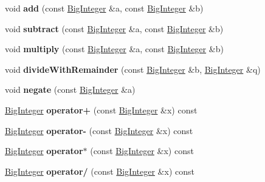 \begin{DoxyCompactItemize}
void {\bfseries add} (const \mbox{\hyperlink{class_big_integer}{Big\+Integer}} \&a, const \mbox{\hyperlink{class_big_integer}{Big\+Integer}} \&b)
\item 
\mbox{\label{class_big_integer_aa7b823f26e3d7716bd8922083548f0c2}} 
void {\bfseries subtract} (const \mbox{\hyperlink{class_big_integer}{Big\+Integer}} \&a, const \mbox{\hyperlink{class_big_integer}{Big\+Integer}} \&b)
\item 
\mbox{\label{class_big_integer_afebc1ad7629bc89399c4fefb4d1d66e3}} 
void {\bfseries multiply} (const \mbox{\hyperlink{class_big_integer}{Big\+Integer}} \&a, const \mbox{\hyperlink{class_big_integer}{Big\+Integer}} \&b)
\item 
\mbox{\label{class_big_integer_a3071d9cc845c601673d2e370f1154ec1}} 
void {\bfseries divide\+With\+Remainder} (const \mbox{\hyperlink{class_big_integer}{Big\+Integer}} \&b, \mbox{\hyperlink{class_big_integer}{Big\+Integer}} \&q)
\item 
\mbox{\label{class_big_integer_affe8d80e624a6918de405bc4c3ec59ca}} 
void {\bfseries negate} (const \mbox{\hyperlink{class_big_integer}{Big\+Integer}} \&a)
\item 
\mbox{\label{class_big_integer_a038cafc13c37f9132f162418aaa5485a}} 
\mbox{\hyperlink{class_big_integer}{Big\+Integer}} {\bfseries operator+} (const \mbox{\hyperlink{class_big_integer}{Big\+Integer}} \&x) const
\item 
\mbox{\label{class_big_integer_a14c4ecd380521e28d6e8547b656926de}} 
\mbox{\hyperlink{class_big_integer}{Big\+Integer}} {\bfseries operator-\/} (const \mbox{\hyperlink{class_big_integer}{Big\+Integer}} \&x) const
\item 
\mbox{\label{class_big_integer_ab14cbe6852656ff22039e2ff22ee536b}} 
\mbox{\hyperlink{class_big_integer}{Big\+Integer}} {\bfseries operator$\ast$} (const \mbox{\hyperlink{class_big_integer}{Big\+Integer}} \&x) const
\item 
\mbox{\label{class_big_integer_acb21ccdd85200d967474044c8fa6d3af}} 
\mbox{\hyperlink{class_big_integer}{Big\+Integer}} {\bfseries operator/} (const \mbox{\hyperlink{class_big_integer}{Big\+Integer}} \&x) const

\end{DoxyCompactItemize}
